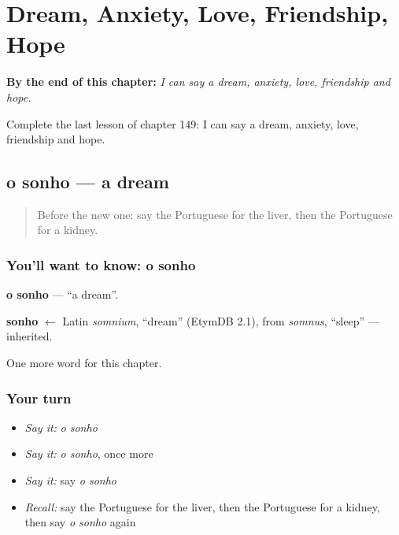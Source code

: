 
\chapter{Dream, Anxiety, Love, Friendship, Hope}
\label{ch:pt-dream-anxiety-love-friendship-hope}

\begin{chapteropening}
\textbf{By the end of this chapter:} \emph{I can say a dream, anxiety, love, friendship and hope.}

Complete the last lesson of chapter 149: I can say a dream, anxiety, love, friendship and hope.
\end{chapteropening}

\section[o sonho]{o sonho — a dream}

\label{lesson:PT-C149-sonho}



\begin{quote}
Before the new one: say the Portuguese for the liver, then the Portuguese for a kidney.
\end{quote}

\subsection*{You'll want to know: o sonho}
\textbf{o sonho} — \textquotedblleft{}a dream\textquotedblright{}.

\begin{cousinweb}
\textbf{sonho} $\leftarrow$ Latin \emph{somnium}, \textquotedblleft{}dream\textquotedblright{} (EtymDB 2.1), from \emph{somnus}, \textquotedblleft{}sleep\textquotedblright{} — inherited.
\end{cousinweb}

\begin{grammarlens}[title={What you've built}]
One more word for this chapter.
\end{grammarlens}

\subsection*{Your turn}
\begin{itemize}
\raggedright
  \item \emph{Say it:} \emph{o sonho}
  \item \emph{Say it:} \emph{o sonho}, once more
  \item \emph{Say it:} say \emph{o sonho}
  \item \emph{Recall:} say the Portuguese for the liver, then the Portuguese for a kidney, then say \emph{o sonho} again
\end{itemize}


